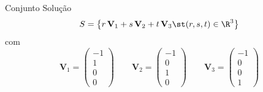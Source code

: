 \begin{resolution}{Conjunto Solução}
  \[
    S = \left\{
      r\, \mathbf{V}_1 +
      s\, \mathbf{V}_2 +
      t\, \mathbf{V}_3
      \st
      (r, s, t) \in \R^3
    \right\}
  \]
  com
  \[
    \mathbf{V}_1 = \begin{pmatrix} -1 \\ 1 \\ 0 \\ 0 \end{pmatrix} \qquad
    \mathbf{V}_2 = \begin{pmatrix} -1 \\ 0 \\ 1 \\ 0 \end{pmatrix} \qquad
    \mathbf{V}_3 = \begin{pmatrix} -1 \\ 0 \\ 0 \\ 1 \end{pmatrix}
  \]
\end{resolution}

\endinput
